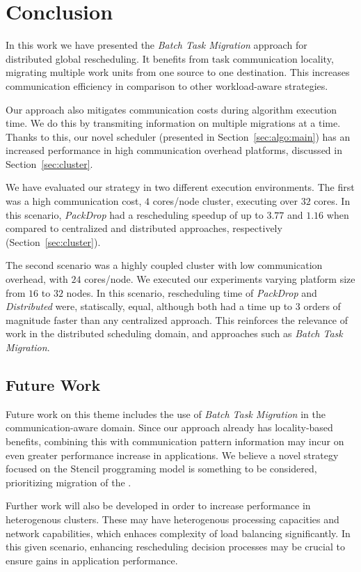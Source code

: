 \section{Conclusion}

In this work we have presented the \textit{Batch Task Migration} approach for distributed global rescheduling.
It benefits from task communication locality, migrating multiple work units from one source to one destination.
This increases communication efficiency in comparison to other workload-aware strategies.

Our approach also mitigates communication costs during algorithm execution time.
We do this by transmiting information on multiple migrations at a time.
Thanks to this, our novel scheduler (presented in Section~\ref{sec:algo:main}) has an increased performance in high communication overhead platforms, discussed in Section~\ref{sec:cluster}.

We have evaluated our strategy in two different execution environments. 
The first was a high communication cost, $4$ cores/node cluster, executing over $32$ cores.
In this scenario, \textit{PackDrop} had a rescheduling speedup of up to $3.77$ and $1.16$ when compared to centralized and distributed approaches, respectively (Section~\ref{sec:cluster}).

The second scenario was a highly coupled cluster with low communication overhead, with $24$ cores/node.
We executed our experiments varying platform size from $16$ to $32$ nodes.
In this scenario, rescheduling time of \textit{PackDrop} and \textit{Distributed} were, statiscally, equal, although both had a time up to $3$ orders of magnitude faster than any centralized approach.
This reinforces the relevance of work in the distributed scheduling domain, and approaches such as \textit{Batch Task Migration}.

\subsection{Future Work}

Future work on this theme includes the use of \textit{Batch Task Migration} in the communication-aware domain.
Since our approach already has locality-based benefits, combining this with communication pattern information may incur on even greater performance increase in applications.
We believe a novel strategy focused on the Stencil proggraming model is something to be considered, prioritizing migration of the .

Further work will also be developed in order to increase performance in heterogenous clusters.
These may have heterogenous processing capacities and network capabilities, which enhaces complexity of load balancing significantly.
In this given scenario, enhancing rescheduling decision processes may be crucial to ensure gains in application performance.
